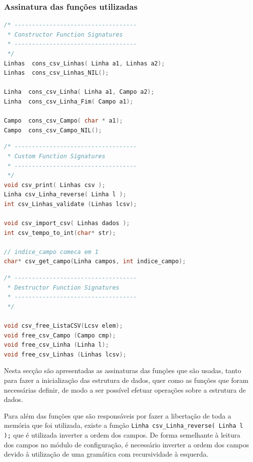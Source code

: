 \documentclass[11pt, a4paper, oneside]{article}
\begin{document}
\newpage
\subsubsection{Assinatura das funções utilizadas}
\begin{lstlisting}[language=C, caption={Construtores do módulo de prova.}]
/* -----------------------------------
 * Constructor Function Signatures
 * -----------------------------------
 */
Linhas  cons_csv_Linhas( Linha a1, Linhas a2);
Linhas  cons_csv_Linhas_NIL();

Linha  cons_csv_Linha( Linha a1, Campo a2);
Linha  cons_csv_Linha_Fim( Campo a1);

Campo  cons_csv_Campo( char * a1);
Campo  cons_csv_Campo_NIL();
\end{lstlisting} 

\begin{lstlisting}[language=C, caption={Funções do módulo de prova.}]
/* -----------------------------------
 * Custom Function Signatures
 * -----------------------------------
 */
void csv_print( Linhas csv );
Linha csv_Linha_reverse( Linha l );
int csv_Linhas_validate (Linhas lcsv);

void csv_import_csv( Linhas dados );
int csv_tempo_to_int(char* str);

// indice_campo comeca em 1
char* csv_get_campo(Linha campos, int indice_campo);
\end{lstlisting} 

\begin{lstlisting}[language=C, caption={Funções de libertação de memória do módulo de prova.}]
/* -----------------------------------
 * Destructor Function Signatures
 * -----------------------------------
 */

void csv_free_ListaCSV(Lcsv elem);
void free_csv_Campo (Campo cmp);
void free_csv_Linha (Linha l);
void free_csv_Linhas (Linhas lcsv);

\end{lstlisting} 

Nesta secção são apresentadas as assinaturas das funções que são usadas, tanto para fazer a inicialização das estrutura de dados, quer como as funções que foram necessárias definir, de modo a ser possível efetuar operações sobre a estrutura de dados.

Para além das funções que são responsáveis por fazer a libertação de toda a memória que foi utilizada, existe a função \texttt{Linha csv\_Linha\_reverse( Linha l );} que é utilizada inverter a ordem dos campos. De forma semelhante à leitura dos campos no módulo de configuração, é necessário inverter a ordem dos campos devido à utilização de uma gramática com recursividade à esquerda.
\end{document}
